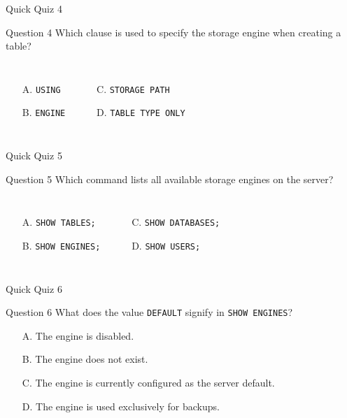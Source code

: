 \documentclass[aspectratio=169,11pt]{beamer}
\newcommand{\code}[1]{\texttt{#1}}
\newcommand{\smallitem}{\setlength{\itemsep}{2pt}}
\begin{document}
\begin{frame}{Quick Quiz 4}
\begin{block}{Question 4}
Which clause is used to specify the storage engine when creating a table?
\end{block}
\vspace{0.2cm}
\begin{columns}[T,onlytextwidth]
\begin{itemize}\smallitem
  \item[A.] \code{USING}
  \item[B.] \code{ENGINE}
\end{itemize}
\begin{itemize}\smallitem
  \item[C.] \code{STORAGE PATH}
  \item[D.] \code{TABLE TYPE ONLY}
\end{itemize}
\end{columns}
\end{frame}

\begin{frame}{Quick Quiz 5}
\begin{block}{Question 5}
Which command lists all available storage engines on the server?
\end{block}
\vspace{0.2cm}
\begin{columns}[T,onlytextwidth]
\begin{itemize}\smallitem
  \item[A.] \code{SHOW TABLES;}
  \item[B.] \code{SHOW ENGINES;}
\end{itemize}
\begin{itemize}\smallitem
  \item[C.] \code{SHOW DATABASES;}
  \item[D.] \code{SHOW USERS;}
\end{itemize}
\end{columns}
\end{frame}

\begin{frame}{Quick Quiz 6}
\begin{block}{Question 6}
What does the value \code{DEFAULT} signify in \code{SHOW ENGINES}?
\end{block}
\vspace{0.2cm}
\begin{itemize}\smallitem
  \item[A.] The engine is disabled.
  \item[B.] The engine does not exist.
  \item[C.] The engine is currently configured as the server default.
  \item[D.] The engine is used exclusively for backups.
\end{itemize}
\end{frame}
\end{document}
